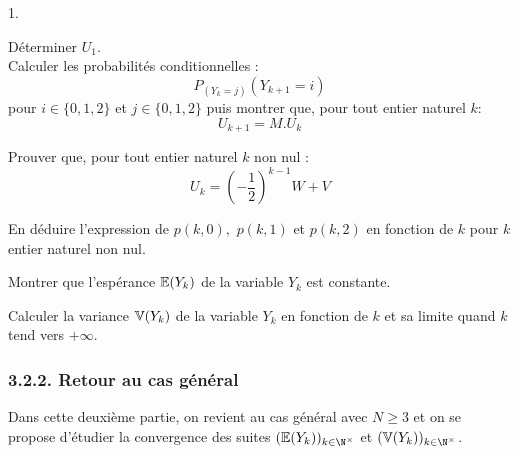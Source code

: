 \documentclass[11pt]{article}%
\begin{document}
\begin{noliste}{1.}
 \setlength{\itemsep}{4mm}
\item Déterminer $U_{1}.$\\
Calculer les probabilités conditionnelles :
\[
P_{(Y_{k} = j)}(Y_{k + 1} = i)
\]
pour $i\in \{0,1,2\}$ et $j\in \{0,1,2\}$ puis montrer que, pour tout
entier
naturel $k :$
\[
U_{k + 1} = M.U_{k}
\]

\item Prouver que, pour tout entier naturel $k$ non nul :
\[
U_{k} = \left( -\dfrac{1}{2}\right) ^{k-1}W + V
\]

\item En déduire l'expression de $p(k,0),$ $p(k,1)$ et $p(k,2)$ en
fonction
de $k$ pour $k$ entier naturel non nul.

\item Montrer que l'espérance $\mathbb{E}(Y_{k})$ de la variable $Y_{k}$ est
constante.

\item Calculer la variance $\mathbb{V}(Y_{k})$ de la variable $Y_{k}$ en
fonction de $k$ et sa limite quand $k$ tend vers $ + \infty.$
\end{noliste}

\subsubsection*{3.2.2. Retour au cas général}

Dans cette deuxième partie, on revient au cas général avec $N\geq 3$ et
on se propose d'étudier la convergence des suites $(\E(Y_{k}))_{k\in
\N^{\times }}$ et $(\V(Y_{k}))_{k\in \N^{\times }}$.
\end{document}
